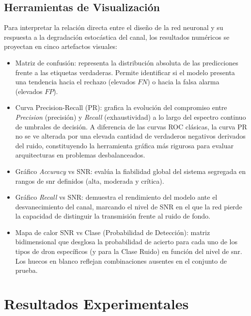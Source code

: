 \subsection{Herramientas de Visualización}
\label{subsec:eval_artefactos}

Para interpretar la relación directa entre el diseño de la red neuronal y su respuesta a la degradación estocástica del canal, los resultados numéricos se proyectan en cinco artefactos visuales:

\begin{itemize}
    \item Matriz de confusión: representa la distribución absoluta de las predicciones frente a las etiquetas verdaderas. Permite identificar si el modelo presenta una tendencia hacia el rechazo (elevados $FN$) o hacia la falsa alarma (elevados $FP$).
    
    \item Curva Precision-Recall (PR): grafica la evolución del compromiso entre \textit{Precision} (precisión) y \textit{Recall} (exhaustividad) a lo largo del espectro continuo de umbrales de decisión. A diferencia de las curvas ROC clásicas, la curva PR no se ve alterada por una elevada cantidad de verdaderos negativos derivados del ruido, constituyendo la herramienta gráfica más rigurosa para evaluar arquitecturas en problemas desbalanceados.
    
    \item Gráfico \textit{Accuracy} vs SNR: evalúa la fiabilidad global del sistema segregada en rangos de \gls{snr} definidos (alta, moderada y crítica).
    
    \item Gráfico \textit{Recall} vs SNR: demuestra el rendimiento del modelo ante el desvanecimiento del canal, marcando el nivel de SNR en el que la red pierde la capacidad de distinguir la transmisión frente al ruido de fondo.
    
    \item Mapa de calor SNR vs Clase (Probabilidad de Detección): matriz bidimensional que desglosa la probabilidad de acierto para cada uno de los tipos de dron específicos (y para la Clase Ruido) en función del nivel de \gls{snr}. Los huecos en blanco reflejan combinaciones ausentes en el conjunto de prueba.
\end{itemize}

\section{Resultados Experimentales}
\label{sec:resultados_experimentales}

